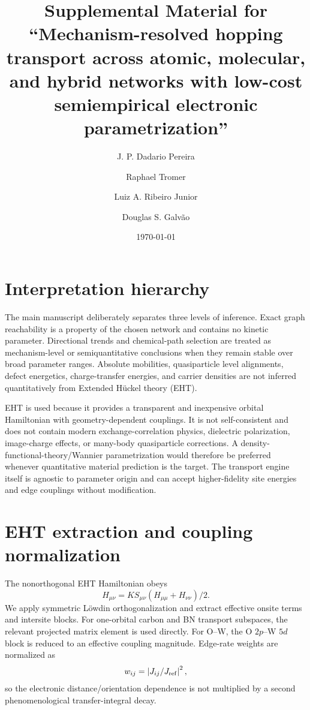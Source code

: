 \documentclass[aps,prmaterials,onecolumn,amsmath,amssymb,superscriptaddress]{revtex4-2}
\begin{document}
\title{Supplemental Material for ``Mechanism-resolved hopping transport across atomic, molecular, and hybrid networks with low-cost semiempirical electronic parametrization''}
\author{J. P. Dadario Pereira}\author{Raphael Tromer}\author{Luiz A. Ribeiro Junior}\author{Douglas S. Galv\~ao}
\date{\today}\maketitle

\section{Interpretation hierarchy}
The main manuscript deliberately separates three levels of inference. Exact graph reachability is a property of the chosen network and contains no kinetic parameter. Directional trends and chemical-path selection are treated as mechanism-level or semiquantitative conclusions when they remain stable over broad parameter ranges. Absolute mobilities, quasiparticle level alignments, defect energetics, charge-transfer energies, and carrier densities are not inferred quantitatively from Extended H\"uckel theory (EHT).

EHT is used because it provides a transparent and inexpensive orbital Hamiltonian with geometry-dependent couplings. It is not self-consistent and does not contain modern exchange-correlation physics, dielectric polarization, image-charge effects, or many-body quasiparticle corrections. A density-functional-theory/Wannier parametrization would therefore be preferred whenever quantitative material prediction is the target. The transport engine itself is agnostic to parameter origin and can accept higher-fidelity site energies and edge couplings without modification.

\section{EHT extraction and coupling normalization}
The nonorthogonal EHT Hamiltonian obeys
\begin{equation}
H_{\mu\nu}=K S_{\mu\nu}(H_{\mu\mu}+H_{\nu\nu})/2.
\end{equation}
We apply symmetric L\"owdin orthogonalization and extract effective onsite terms and intersite blocks. For one-orbital carbon and BN transport subspaces, the relevant projected matrix element is used directly. For O--W, the O $2p$--W $5d$ block is reduced to an effective coupling magnitude. Edge-rate weights are normalized as
\begin{equation}
w_{ij}=\left|J_{ij}/J_{\rm ref}\right|^2,
\end{equation}
so the electronic distance/orientation dependence is not multiplied by a second phenomenological transfer-integral decay.
\end{document}
